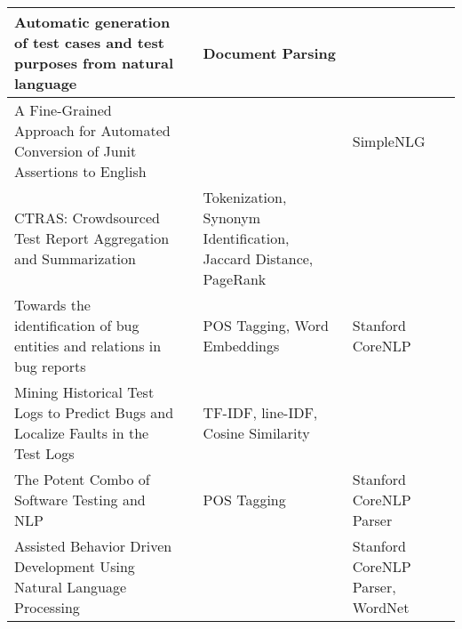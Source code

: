 \begin{longtable}{|p{4cm}|p{4cm}|p{4cm}|p{4cm}|}
            \hline Automatic generation of test cases and test purposes from natural language & \cite{nogueira2015automatic} & Document Parsing & \\
            \hline A Fine-Grained Approach for Automated Conversion of Junit Assertions to English  & \cite{10.1145/3283812.3283819} &   & SimpleNLG\\
            \hline CTRAS: Crowdsourced Test Report Aggregation and Summarization  & \cite{8811987} & Tokenization, Synonym Identification, Jaccard Distance, PageRank & \\
            \hline Towards the identification of bug entities and relations in bug reports & \cite{li2022towards} & POS Tagging, Word Embeddings & Stanford CoreNLP\\
            \hline Mining Historical Test Logs to Predict Bugs and Localize Faults in the Test Logs & \cite{8812113} & TF-IDF, line-IDF, Cosine Similarity & \\
            \hline The Potent Combo of Software Testing and NLP & \cite{mulla2020potent} & POS Tagging & Stanford CoreNLP Parser\\
            \hline Assisted Behavior Driven Development Using Natural Language Processing & \cite{soeken2012assisted} &  & Stanford CoreNLP Parser, WordNet\\
        \hline

\end{longtable}
